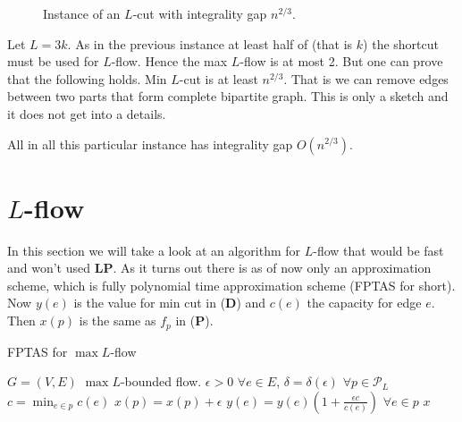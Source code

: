 \begin{figure}[!ht]
	\caption{Instance of an $L$-cut with integrality gap $n^{2/3}$.}
	\label{huge integrality gap}
\end{figure}

Let $L = 3k$. As in the previous instance at least half of (that is $k$) the shortcut must be used for $L$-flow. Hence the max $L$-flow is at most 2. But one can prove that the following holds. Min $L$-cut is at least $n^{2/3}$. That is we can remove edges between two parts that form complete bipartite graph. This is only a sketch and it does not get into a details.

All in all this particular instance has integrality gap $O(n^{2/3})$.

\section{$L$-flow}

In this section we will take a look at an algorithm for $L$-flow that would be fast and won't used \textbf{LP}. As it turns out there is as of now only an approximation scheme, which is fully polynomial time approximation scheme (FPTAS for short). Now $y(e)$ is the value for min cut in (\textbf{D}) and $c(e)$ the capacity for edge $e$. Then $x(p)$ is the same as $f_p$ in (\textbf{P}).

\begin{algorithm}
	\caption{FPTAS for $\max L$-flow}
	\begin{algorithmic}[1]
		\Require $G = (V,E)$
		\Ensure $\max L$-bounded flow.
		\State $\epsilon > 0$ $\forall e \in E$, $\delta = \delta(\epsilon)$ $\forall p \in \mathcal{P}_L$
			\State $c = \min_{e \in p} c(e)$
			\State $x(p) = x(p) + \epsilon$
			\State $y(e) = y(e) \left( 1 + \frac{\epsilon c}{c(e)} \right)$ $\forall e \in p$
		\EndWhile
		\State \Return $x$
	\end{algorithmic}
\end{algorithm}


